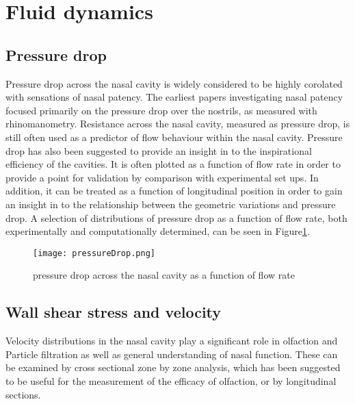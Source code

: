 \section{Fluid dynamics}


\subsection{Pressure drop}

Pressure drop across the nasal cavity is widely considered to be highly corolated with sensations of nasal patency\cite{Ottaviano2016}.
The earliest papers investigating nasal patency focused primarily on the pressure drop over the nostrils, as measured with rhinomanometry\cite{Martin1981}. 
Resistance across the nasal cavity, measured as pressure drop, is still often used as a predictor of flow behaviour within the nasal cavity\cite{Edelstein1996, Lindemann2008, WhanKim2007}. 
Pressure drop has also been suggested to provide an insight in to the inspirational efficiency of the cavities\cite{Lintermann2013}. 
It is often plotted as a function of flow rate in order to provide a point for validation by comparison with experimental set ups\cite{Wen2008, Inthavong2014}. 
In addition, it can be treated as a function of longitudinal position in order to gain an insight in to the relationship between the geometric variations and pressure drop\cite{Lintermann2013}. 
A selection of distributions of pressure drop as a function of flow rate, both experimentally and computationally determined, can be seen in Figure\ref{fig:pvf}. 


\begin{figure}
  \centering
  \texttt{[image: pressureDrop.png]}
  \caption{pressure drop across the nasal cavity as a function of flow rate} \label{fig:pvf}
\centering
\end{figure}

 \subsection{Wall shear stress and velocity}

Velocity distributions in the nasal cavity play a significant role in olfaction\cite{Ishikawa2009} and Particle filtration\cite{Inthavong2006, Wang2009a} as well as general understanding of nasal function\cite{Keyhani1995, Zhu2011, Lintermann2013}. 
These can be examined by cross sectional zone by zone analysis\cite{Keyhani1995, Zhu2011}, which has been suggested to be useful for the measurement of the efficacy of olfaction\cite{Zhu2011}, or by longitudinal sections\cite{Lintermann2013,Taylor2010}. 

